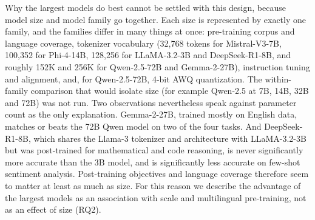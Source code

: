 \documentclass[10pt,letterpaper]{article}
\begin{document}
Why the largest models do best cannot be settled with this design, because model size and model family go together. Each size is represented by exactly one family, and the families differ in many things at once: pre-training corpus and language coverage, tokenizer vocabulary (32,768 tokens for Mistral-V3-7B, 100,352 for Phi-4-14B, 128,256 for LLaMA-3.2-3B and DeepSeek-R1-8B, and roughly 152K and 256K for Qwen-2.5-72B and Gemma-2-27B), instruction tuning and alignment, and, for Qwen-2.5-72B, 4-bit AWQ quantization. The within-family comparison that would isolate size (for example Qwen-2.5 at 7B, 14B, 32B and 72B) was not run. Two observations nevertheless speak against parameter count as the only explanation. Gemma-2-27B, trained mostly on English data, matches or beats the 72B Qwen model on two of the four tasks. And DeepSeek-R1-8B, which shares the Llama-3 tokenizer and architecture with LLaMA-3.2-3B but was post-trained for mathematical and code reasoning, is never significantly more accurate than the 3B model, and is significantly less accurate on few-shot sentiment analysis. Post-training objectives and language coverage therefore seem to matter at least as much as size. For this reason we describe the advantage of the largest models as an association with scale and multilingual pre-training, not as an effect of size (RQ2).
\end{document}
